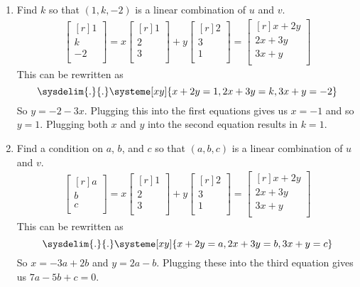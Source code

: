 \documentclass[12pt]{article}
\begin{document}
\begin{enumerate}
\begin{enumerate}
	\item Find $k$ so that $(1,k,-2)$ is a linear combination of $u$ and $v$.
		\begin{align*}
		\begin{bmatrix}[r]1\\k\\-2\\ \end{bmatrix}
		= x \begin{bmatrix}[r] 1\\2\\3\\ \end{bmatrix}
		+ y \begin{bmatrix}[r] 2\\3\\1\\ \end{bmatrix}
		= \begin{bmatrix}[r] x+2y\\ 2x+3y\\ 3x+y\\ \end{bmatrix}
		\end{align*}
		This can be rewritten as
		\[ \sysdelim{.}{.}\systeme[xy]{x+2y=1,2x+3y=k,3x+y=-2} \]
		So $y=-2-3x$. Plugging this into the first equations gives us $x=-1$ and so $y=1$. Plugging both $x$ and $y$ into the second equation results in $k=1$.		
		
	\item Find a condition on $a$, $b$, and $c$ so that $(a,b,c)$ is a linear combination of $u$ and $v$.
		\begin{align*}
		\begin{bmatrix}[r]a\\b\\c\\ \end{bmatrix}
		= x \begin{bmatrix}[r] 1\\2\\3\\ \end{bmatrix}
		+ y \begin{bmatrix}[r] 2\\3\\1\\ \end{bmatrix}
		= \begin{bmatrix}[r] x+2y\\ 2x+3y\\ 3x+y\\ \end{bmatrix}
		\end{align*}
		This can be rewritten as
		\[ \sysdelim{.}{.}\systeme[xy]{x+2y=a,2x+3y=b,3x+y=c} \]
		So $x=-3a+2b$ and $y=2a-b$. Plugging these into the third equation gives us $7a-5b+c=0$.
		

\end{enumerate}
\end{enumerate}
\end{document}
